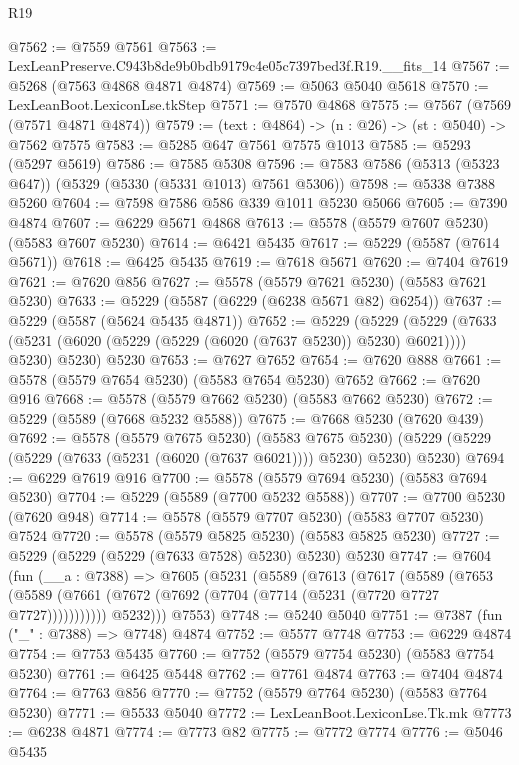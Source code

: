 \begin{lexlean}{R19}
\begin{coremodule}
@7562 := @7559 @7561
@7563 := LexLeanPreserve.C943b8de9b0bdb9179c4e05c7397bed3f.R19.__fits_14
@7567 := @5268 (@7563 @4868 @4871 @4874)
@7569 := @5063 @5040 @5618
@7570 := LexLeanBoot.LexiconLse.tkStep
@7571 := @7570 @4868
@7575 := @7567 (@7569 (@7571 @4871 @4874))
@7579 := (text : @4864) -> (n : @26) -> (st : @5040) -> @7562 @7575
@7583 := @5285 @647 @7561 @7575 @1013
@7585 := @5293 (@5297 @5619)
@7586 := @7585 @5308
@7596 := @7583 @7586 (@5313 (@5323 @647)) (@5329 (@5330 (@5331 @1013) @7561 @5306))
@7598 := @5338 @7388 @5260
@7604 := @7598 @7586 @586 @339 @1011 @5230 @5066
@7605 := @7390 @4874
@7607 := @6229 @5671 @4868
@7613 := @5578 (@5579 @7607 @5230) (@5583 @7607 @5230)
@7614 := @6421 @5435
@7617 := @5229 (@5587 (@7614 @5671))
@7618 := @6425 @5435
@7619 := @7618 @5671
@7620 := @7404 @7619
@7621 := @7620 @856
@7627 := @5578 (@5579 @7621 @5230) (@5583 @7621 @5230)
@7633 := @5229 (@5587 (@6229 (@6238 @5671 @82) @6254))
@7637 := @5229 (@5587 (@5624 @5435 @4871))
@7652 := @5229
    (@5229
      (@5229 (@7633 (@5231 (@6020 (@5229 (@5229 (@6020 (@7637 @5230)) @5230) @6021)))) @5230)
      @5230)
    @5230
@7653 := @7627 @7652
@7654 := @7620 @888
@7661 := @5578 (@5579 @7654 @5230) (@5583 @7654 @5230) @7652
@7662 := @7620 @916
@7668 := @5578 (@5579 @7662 @5230) (@5583 @7662 @5230)
@7672 := @5229 (@5589 (@7668 @5232 @5588))
@7675 := @7668 @5230 (@7620 @439)
@7692 := @5578
    (@5579 @7675 @5230)
    (@5583 @7675 @5230)
    (@5229 (@5229 (@5229 (@7633 (@5231 (@6020 (@7637 @6021)))) @5230) @5230) @5230)
@7694 := @6229 @7619 @916
@7700 := @5578 (@5579 @7694 @5230) (@5583 @7694 @5230)
@7704 := @5229 (@5589 (@7700 @5232 @5588))
@7707 := @7700 @5230 (@7620 @948)
@7714 := @5578 (@5579 @7707 @5230) (@5583 @7707 @5230) @7524
@7720 := @5578 (@5579 @5825 @5230) (@5583 @5825 @5230)
@7727 := @5229 (@5229 (@5229 (@7633 @7528) @5230) @5230) @5230
@7747 := @7604
    (fun (__a : @7388) =>
    @7605
      (@5231
        (@5589
          (@7613
            (@7617
              (@5589
                (@7653
                  (@5589 (@7661 (@7672 (@7692 (@7704 (@7714 (@5231 (@7720 @7727 @7727)))))))))))
            @5232)))
      @7553)
@7748 := @5240 @5040
@7751 := @7387 (fun ("_" : @7388) => @7748) @4874
@7752 := @5577 @7748
@7753 := @6229 @4874
@7754 := @7753 @5435
@7760 := @7752 (@5579 @7754 @5230) (@5583 @7754 @5230)
@7761 := @6425 @5448
@7762 := @7761 @4874
@7763 := @7404 @4874
@7764 := @7763 @856
@7770 := @7752 (@5579 @7764 @5230) (@5583 @7764 @5230)
@7771 := @5533 @5040
@7772 := LexLeanBoot.LexiconLse.Tk.mk
@7773 := @6238 @4871
@7774 := @7773 @82
@7775 := @7772 @7774
@7776 := @5046 @5435

\end{coremodule}
\end{lexlean}
